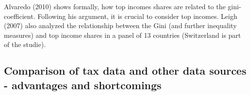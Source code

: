 \documentclass[twoside]{article}\usepackage[]{graphicx}\usepackage[]{color}
\begin{document}
\begin{multicols}{2}
Alvaredo (2010) shows formally, how top incomes shares are related to the gini-coefficient. Following his argument, it is crucial to consider top incomes. Leigh (2007) also analyzed the relationship between the Gini (and further inequality measures) and top income shares in a panel of 13 countries (Switzerland is part of the studie). 

\subsection{Comparison of tax data and other data sources - advantages and shortcomings}





\end{multicols}
\end{document}
